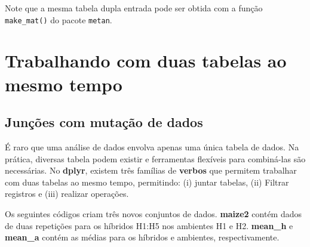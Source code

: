 \documentclass[
]{book}
\newenvironment{Shaded}{\begin{snugshade}}{\end{snugshade}}
\newcommand{\CommentTok}[1]{\textcolor[rgb]{0.56,0.35,0.01}{\textit{#1}}}
\newcommand{\DataTypeTok}[1]{\textcolor[rgb]{0.13,0.29,0.53}{#1}}
\newcommand{\DecValTok}[1]{\textcolor[rgb]{0.00,0.00,0.81}{#1}}
\newcommand{\KeywordTok}[1]{\textcolor[rgb]{0.13,0.29,0.53}{\textbf{#1}}}
\newcommand{\NormalTok}[1]{#1}
\newcommand{\OperatorTok}[1]{\textcolor[rgb]{0.81,0.36,0.00}{\textbf{#1}}}
\newcommand{\StringTok}[1]{\textcolor[rgb]{0.31,0.60,0.02}{#1}}
\begin{document}
Note que a mesma tabela dupla entrada pode ser obtida com a função \texttt{make\_mat()} do pacote \texttt{metan}.

\begin{Shaded}
\end{Shaded}

\hypertarget{trabalhando-com-duas-tabelas-ao-mesmo-tempo}{%
\section{Trabalhando com duas tabelas ao mesmo tempo}\label{trabalhando-com-duas-tabelas-ao-mesmo-tempo}}

\hypertarget{junuxe7uxf5es-com-mutauxe7uxe3o-de-dados}{%
\subsection{Junções com mutação de dados}\label{junuxe7uxf5es-com-mutauxe7uxe3o-de-dados}}

É raro que uma análise de dados envolva apenas uma única tabela de dados. Na prática, diversas tabela podem existir e ferramentas flexíveis para combiná-las são necessárias. No \textbf{dplyr}, existem três famílias de \textbf{verbos} que permitem trabalhar com duas tabelas ao mesmo tempo, permitindo: (i) juntar tabelas, (ii) Filtrar registros e (iii) realizar operações.

Os seguintes códigos criam três novos conjuntos de dados. \textbf{maize2} contém dados de duas repetições para os híbridos H1:H5 nos ambientes H1 e H2. \textbf{mean\_h} e \textbf{mean\_a} contém as médias para os híbridos e ambientes, respectivamente. 
\end{document}

